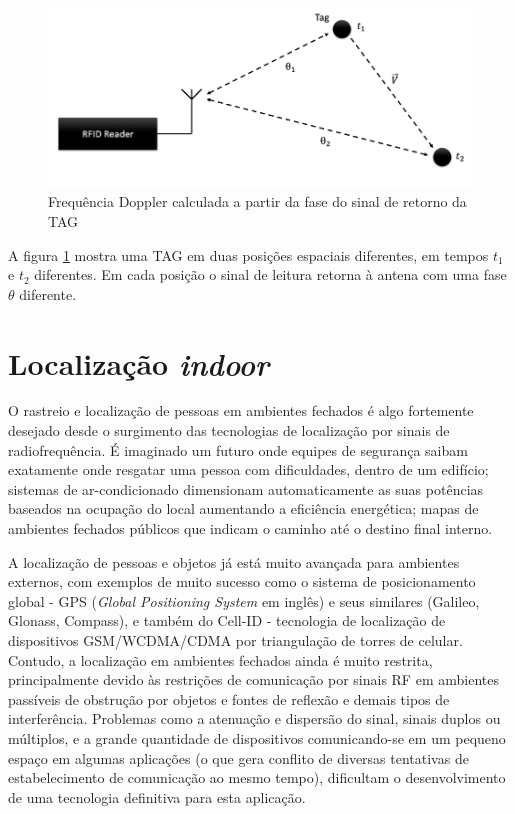 \begin{figure}[H]
    \centering
    \includegraphics[width=0.8\linewidth]{figs/Fundamentos/doppler.PNG}
    \caption{Frequência Doppler calculada a partir da fase do sinal de retorno da TAG \cite{tesch2015rfid}}
    \label{fig:dopplerFund}
\end{figure}

A figura \ref{fig:dopplerFund} mostra uma TAG em duas posições espaciais diferentes, em tempos $t_1$ e $t_2$ diferentes. Em cada posição o sinal de leitura retorna à antena com uma fase $\theta$ diferente.
    
\section{Localização \textit{indoor}}

O rastreio e localização de pessoas em ambientes fechados é algo fortemente desejado desde o surgimento das tecnologias de localização por sinais de radiofrequência. É imaginado um futuro onde equipes de segurança saibam exatamente onde resgatar uma pessoa com dificuldades, dentro de um edifício; sistemas de ar-condicionado dimensionam automaticamente as suas potências baseados na ocupação do local aumentando a eficiência energética; mapas de ambientes fechados públicos que indicam o caminho até o destino final interno.

A localização de pessoas e objetos já está muito avançada para ambientes externos, com exemplos de muito sucesso como o sistema de posicionamento global - GPS (\textit{Global Positioning System} em inglês) e seus similares (Galileo, Glonass, Compass), e também do Cell-ID - tecnologia de localização de dispositivos GSM/WCDMA/CDMA por triangulação de torres de celular. Contudo, a localização em ambientes fechados ainda é muito restrita, principalmente devido às restrições de comunicação por sinais RF em ambientes passíveis de obstrução por objetos e fontes de reflexão e demais tipos de interferência. Problemas como a atenuação e dispersão do sinal, sinais duplos ou múltiplos, e a grande quantidade de dispositivos comunicando-se em um pequeno espaço em algumas aplicações (o que gera conflito de diversas tentativas de estabelecimento de comunicação ao mesmo tempo), dificultam o desenvolvimento de uma tecnologia definitiva para esta aplicação.

